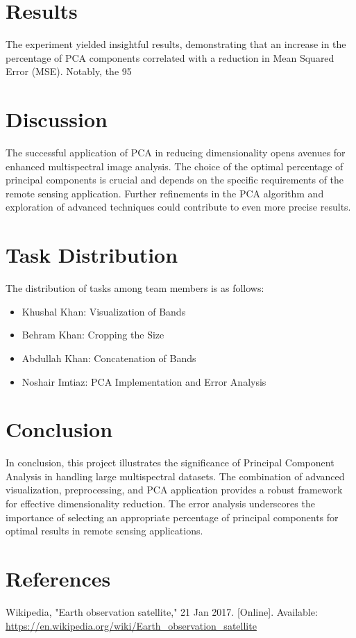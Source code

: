 \documentclass[conference]{IEEEtran}
\begin{document}
\section{Results}
The experiment yielded insightful results, demonstrating that an increase in the percentage of PCA components correlated with a reduction in Mean Squared Error (MSE). Notably, the 95%

\section{Discussion}
The successful application of PCA in reducing dimensionality opens avenues for enhanced multispectral image analysis. The choice of the optimal percentage of principal components is crucial and depends on the specific requirements of the remote sensing application. Further refinements in the PCA algorithm and exploration of advanced techniques could contribute to even more precise results.

\section{Task Distribution}
The distribution of tasks among team members is as follows:

\begin{itemize}
    \item Khushal Khan: Visualization of Bands
    \item Behram Khan: Cropping the Size
    \item Abdullah Khan: Concatenation of Bands
    \item Noshair Imtiaz: PCA Implementation and Error Analysis
\end{itemize}

\section{Conclusion}
In conclusion, this project illustrates the significance of Principal Component Analysis in handling large multispectral datasets. The combination of advanced visualization, preprocessing, and PCA application provides a robust framework for effective dimensionality reduction. The error analysis underscores the importance of selecting an appropriate percentage of principal components for optimal results in remote sensing applications.

\section*{References}
\begin{thebibliography}{1}
    Wikipedia, "Earth observation satellite," 21 Jan 2017. [Online]. Available: \url{https://en.wikipedia.org/wiki/Earth_observation_satellite}
\end{thebibliography}
\end{document}
